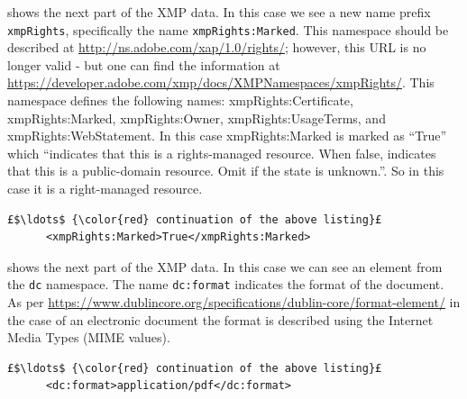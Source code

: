  shows the next part of the XMP data. In this case we see a new name prefix \texttt{xmpRights}, specifically the name \texttt{xmpRights:Marked}. This namespace should be described at \url{http://ns.adobe.com/xap/1.0/rights/}; however, this URL is no longer valid - but one can find the information at \url{https://developer.adobe.com/xmp/docs/XMPNamespaces/xmpRights/}. This namespace defines the following names: xmpRights:Certificate, xmpRights:Marked, xmpRights:Owner, xmpRights:UsageTerms, and xmpRights:WebStatement. In this case xmpRights:Marked is marked as ``True'' which ``indicates that this is a rights-managed resource. When false, indicates that this is a public-domain resource. Omit if the state is unknown.''. So in this case it is a right-managed resource.
\begin{lstlisting}[style=myXML,
caption={The \texttt{xmpRights:Marked} metadata embedded in a PDF file}, label={lst:pdfinfoOutputPart4}]
£$\ldots$ {\color{red} continuation of the above listing}£ 
      <xmpRights:Marked>True</xmpRights:Marked>
\end{lstlisting}

 shows the next part of the XMP data. In this case we can see an element from the \texttt{dc} namespace. The name \texttt{dc:format} indicates the format of the document. As per \url{https://www.dublincore.org/specifications/dublin-core/format-element/} in the case of an electronic document the format is described using the Internet Media Types (\ie MIME values).
\begin{lstlisting}[style=myXML,
caption={The \texttt{dc:format} metadata embedded in a PDF file}, label={lst:pdfinfoOutputPart5}]
£$\ldots$ {\color{red} continuation of the above listing}£ 
      <dc:format>application/pdf</dc:format>
\end{lstlisting}

